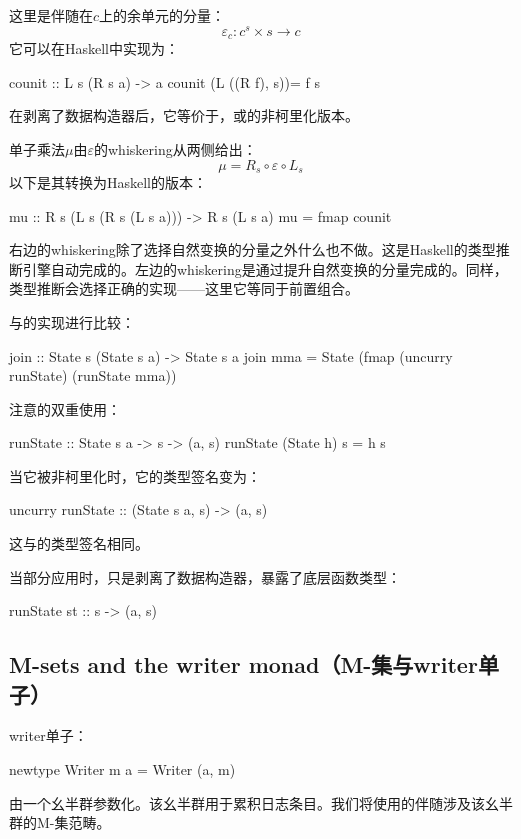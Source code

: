 \documentclass[DaoFP]{subfiles}
\begin{document}
    这里是伴随在$c$上的余单元的分量：
    \[ \varepsilon_c \colon c^s \times s \to c \]
    它可以在Haskell中实现为：
    \begin{haskell}
        counit :: L s (R s a) -> a
        counit (L ((R f), s))= f s
    \end{haskell}
    在剥离了数据构造器后，它等价于，或的非柯里化版本。

    单子乘法$\mu$由$\varepsilon$的whiskering从两侧给出：
    \[ \mu = R_s \circ \varepsilon \circ L_s \]
    以下是其转换为Haskell的版本：
    \begin{haskell}
        mu :: R s (L s (R s (L s a))) -> R s (L s a)
        mu = fmap counit
    \end{haskell}
    右边的whiskering除了选择自然变换的分量之外什么也不做。这是Haskell的类型推断引擎自动完成的。左边的whiskering是通过提升自然变换的分量完成的。同样，类型推断会选择正确的实现——这里它等同于前置组合。

    与的实现进行比较：
    \begin{haskell}
        join :: State s (State s a) -> State s a
        join mma = State (fmap (uncurry runState) (runState mma))
    \end{haskell}
    注意的双重使用：
    \begin{haskell}
        runState :: State s a -> s -> (a, s)
        runState (State h) s = h s
    \end{haskell}
    当它被非柯里化时，它的类型签名变为：
    \begin{haskell}
        uncurry runState :: (State s a, s) -> (a, s)
    \end{haskell}
    这与的类型签名相同。

    当部分应用时，只是剥离了数据构造器，暴露了底层函数类型：
    \begin{haskell}
        runState st :: s -> (a, s)
    \end{haskell}

    \subsection{M-sets and the writer monad（M-集与writer单子）}

    writer单子：
    \begin{haskell}
        newtype Writer m a = Writer (a, m)
    \end{haskell}
    由一个幺半群参数化。该幺半群用于累积日志条目。我们将使用的伴随涉及该幺半群的M-集范畴。
\end{document}
